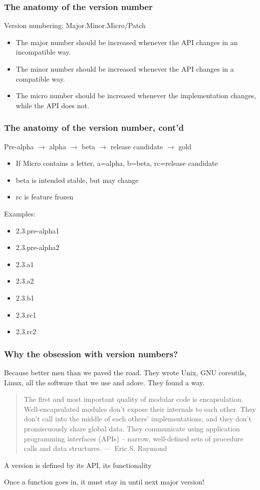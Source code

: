 \documentclass{beamer}
\begin{document}
\begin{frame}
  \frametitle{The anatomy of the version number}

  Version numbering:  Major.Minor.Micro/Patch

  \begin{itemize}
  \item The major number should be increased whenever the API changes in an
    incompatible way.
  \item The minor number should be increased whenever the API changes in a
    compatible way.
  \item The micro number should be increased whenever the implementation
    changes, while the API does not.
  \end{itemize}

\end{frame}
\begin{frame}
  \frametitle{The anatomy of the version number, cont'd}

  Pre-alpha $\to$ alpha $\to$ beta $\to$ release candidate $\to$ gold

  \begin{itemize}
  \item If Micro contains a letter, a=alpha, b=beta, rc=release candidate
  \item beta is intended stable, but may change
  \item rc is feature frozen
  \end{itemize}

  Examples:
  \begin{itemize}
  \item 2.3.pre-alpha1
  \item 2.3.pre-alpha2
  \item 2.3.a1
  \item 2.3.a2
  \item 2.3.b1
  \item 2.3.rc1
  \item 2.3.rc2
  \end{itemize}
\end{frame}


\begin{frame}
  \frametitle{Why the obsession with version numbers?}

  Because better men than we paved the road.  They wrote Unix, GNU coreutils,
  Linux, all the software that we use and adore.  They found a way.

  \begin{quote}
    The first and most important quality of modular code is encapsulation.
    Well-encapsulated modules don't expose their internals to each other.  They
    don't call into the middle of each others' implementations, and they don't
    promiscuously share global data.  They communicate using application
    programming interfaces (APIs) -- narrow, well-defined sets of procedure
    calls and data structures.  ---~Eric S. Raymond
  \end{quote}

  A version is defined by its API, its functionality

  Once a function goes in, it must stay in until next major version!
\end{frame}
\end{document}
